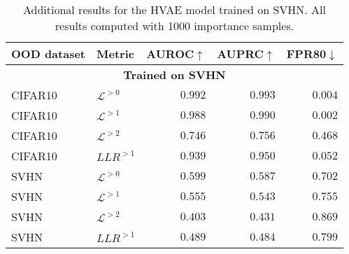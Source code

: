 {\begin{table}[t]
    \caption[Additional results for the HVAE model trained on SVHN.]{Additional results for the HVAE model trained on SVHN. All results computed with 1000 importance samples.}
    \label{tab_hierarchical:additional-results-svhn}
    \centering
    \begin{tabular}{llrrr}
        \toprule
        OOD dataset & Metric & AUROC$\uparrow$ & AUPRC$\uparrow$ & FPR80$\downarrow$ \\
        \midrule
        \multicolumn{5}{c}{\textbf{Trained on SVHN}} \\
        \midrule
        CIFAR10            &  $\mathcal{L}^{>0}$         &  $0.992$  &  $0.993$  &  $0.004$  \\
        CIFAR10            &  $\mathcal{L}^{>1}$         &  $0.988$  &  $0.990$  &  $0.002$  \\
        CIFAR10            &  $\mathcal{L}^{>2}$         &  $0.746$  &  $0.756$  &  $0.468$  \\
        CIFAR10            &  $LLR^{>1}$       &  $0.939$  &  $0.950$  &  $0.052$  \\
        \midrule
        SVHN               &  $\mathcal{L}^{>0}$         &  $0.599$  &  $0.587$  &  $0.702$  \\
        SVHN               &  $\mathcal{L}^{>1}$         &  $0.555$  &  $0.543$  &  $0.755$  \\
        SVHN               &  $\mathcal{L}^{>2}$         &  $0.403$  &  $0.431$  &  $0.869$  \\
        SVHN               &  $LLR^{>1}$       &  $0.489$  &  $0.484$  &  $0.799$  \\
        \bottomrule
    \end{tabular}
\end{table}

}
